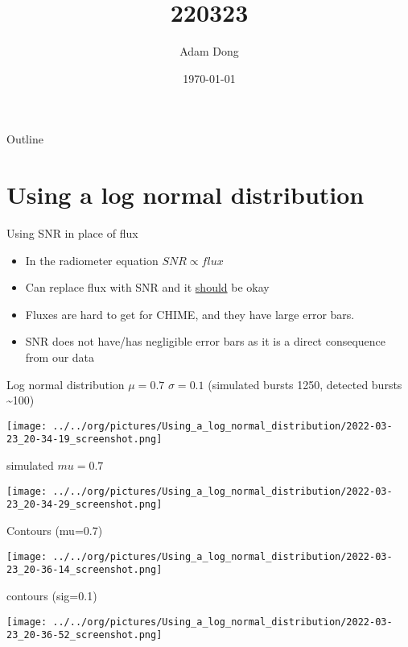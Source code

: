 \documentclass[presentation]{beamer}
\author{Adam Dong}
\date{\today}
\title{220323}
\begin{document}
\maketitle
\begin{frame}{Outline}
\setcounter{tocdepth}{1}
\tableofcontents
\end{frame}


\section{Using a log normal distribution}
\label{sec:orgd2ef807}
\begin{frame}[label={sec:orga8c5fd3}]{Using SNR in place of flux}
\begin{itemize}
\item In the radiometer equation \(SNR \propto flux\)
\item Can replace flux with SNR and it \uline{should} be okay
\item Fluxes are hard to get for CHIME, and they have large error bars.
\item SNR does not have/has negligible error bars as it is a direct consequence from our data
\end{itemize}
\end{frame}
\begin{frame}[label={sec:org386abe2}]{Log normal distribution \(\mu=0.7\) \(\sigma=0.1\) (simulated bursts 1250, detected bursts \textasciitilde{}100)}
\begin{center}
\texttt{[image: ../../org/pictures/Using\_a\_log\_normal\_distribution/2022-03-23\_20-34-19\_screenshot.png]}
\end{center}
\end{frame}
\begin{frame}[label={sec:org06c367f}]{simulated \(mu=0.7\)}
\begin{center}
\texttt{[image: ../../org/pictures/Using\_a\_log\_normal\_distribution/2022-03-23\_20-34-29\_screenshot.png]}
\end{center}
\end{frame}
\begin{frame}[label={sec:org9e1cb83}]{Contours (mu=0.7)}
\begin{center}
\texttt{[image: ../../org/pictures/Using\_a\_log\_normal\_distribution/2022-03-23\_20-36-14\_screenshot.png]}
\end{center}
\end{frame}
\begin{frame}[label={sec:org6b5b853}]{contours (sig=0.1)}
\begin{center}
\texttt{[image: ../../org/pictures/Using\_a\_log\_normal\_distribution/2022-03-23\_20-36-52\_screenshot.png]}
\end{center}
\end{frame}
\end{document}
